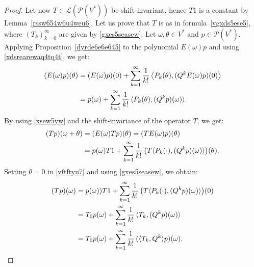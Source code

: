 \documentclass[12pt]{article}
\newtheorem{corollary}[theorem]{Corollary}
\theoremstyle{remark}
\theoremstyle{remark}
\theoremstyle{remark}
\begin{document}
\begin{proof}
Let now $T \in \mathcal L(\mathcal P  (V^*))$ be shift-invariant, hence $T1$ is a constant by Lemma~\ref{rssw654w6u4weu6}. Let us prove that $T$ is as in formula~\eqref{vgxds5ese5}, where $(T_k)_{k=0}^\infty$  are given by \eqref{gxes5seasew}. Let $\omega,\theta \in V^*$ and  $p \in \mathcal P  (V^*)$. Applying Proposition~\ref{dyrde6e6e645}   to the polynomial $E(\omega)p$ and using \eqref{xdsrearewaq4tq4t}, we get:  
\begin{align}(E(\omega)p)(\theta)&=(E(\omega)p)(0)+\sum_{k=1}^\infty \frac{1}{k!}\,\big\langle P_k(\theta), (Q^{k}E(\omega)p)(0)\big\rangle\notag\\
&=p(\omega)+\sum_{k=1}^\infty \frac{1}{k!}\,\langle P_k(\theta), (Q^{k}p)(\omega)\rangle.\label{xsew5yw}
\end{align}
By using \eqref{xsew5yw} and the shift-invariance of the operator $T$, we get:
\begin{align}
(Tp)(\omega+\theta)&=(E(\omega)Tp)(\theta)=(TE(\omega)p)(\theta)\notag\\
&=
p(\omega)T1+\sum_{k=1}^\infty \frac{1}{k!}\,
\big(T\langle  P_k(\cdot), (Q^{k}p)(\omega)\rangle\big)(\theta).\label{vftftyu7}
\end{align}
Setting $\theta=0$ in \eqref{vftftyu7} and using \eqref{gxes5seasew}, we obtain:
\begin{align*}
(Tp)(\omega)&=p(\omega))T1+\sum_{k=1}^\infty \frac{1}{k!}\,
\big(T\langle  P_k(\cdot), (Q^{k}p)(\omega)\rangle\big)(0)
\\
&=T_0p(\omega)+\sum_{k=1}^\infty \frac{1}{k!}\,\langle T_k,(Q^{k}p)(\omega)\rangle\\
&=T_0p(\omega)+\sum_{k=1}^\infty \frac{1}{k!}\,(\langle T_k,
Q^{k}\rangle p)(\omega).\qedhere \end{align*}
\end{proof}


\end{document}
